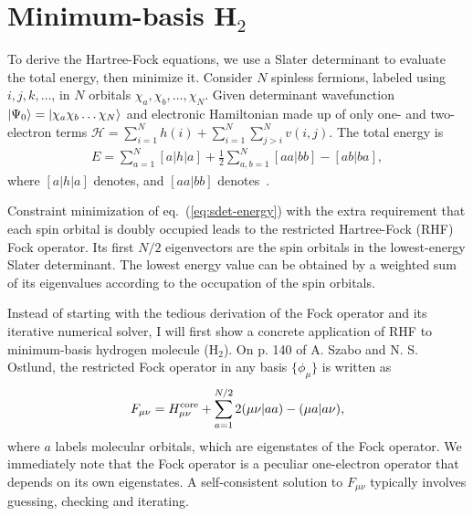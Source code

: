 \chapter{Minimum-basis H$_2$} \label{app:mbh2}
To derive the Hartree-Fock equations, we use a Slater determinant to evaluate the total energy, then minimize it. Consider $N$ spinless fermions, labeled using $i,j,k,\dots$, in $N$ orbitals $\chi_a,\chi_b,\dots,\chi_N$. Given determinant wavefunction $\ket{\Psi_0}=\ket{\chi_a\chi_b\dots\chi_N}$ and electronic Hamiltonian made up of only one- and two-electron terms $\mathcal{H}=\sum\limits_{i=1}^N h(i) + \sum\limits_{i=1}^N\sum\limits_{j>i}^N v(i,j)$. The total energy is
\begin{align} \label{eq:sdet-energy}
E= \sum\limits_{a=1}^N [a|h|a] + \frac{1}{2}\sum\limits_{a,b=1}^N [aa|bb] - [ab|ba],
\end{align}
where $[a|h|a]$ denotes, and $[aa|bb]$ denotes~\cite{Szabo1996}.

Constraint minimization of eq.~(\ref{eq:sdet-energy}) with the extra requirement that each spin orbital is doubly occupied leads to the restricted Hartree-Fock (RHF) Fock operator. Its first $N/2$ eigenvectors are the spin orbitals in the lowest-energy Slater determinant. The lowest energy value can be obtained by a weighted sum of its eigenvalues according to the occupation of the spin orbitals.

Instead of starting with the tedious derivation of the Fock operator and its iterative numerical solver, I will first show a concrete application of RHF to minimum-basis hydrogen molecule (H$_2$). %
On p. 140 of A. Szabo and N. S. Ostlund, the restricted Fock operator in any basis $\{\phi_\mu\}$ is written as
\begin{align}
F_{\mu\nu} = H^{\text{core}}_{\mu\nu} + \sum\limits_{a=1}^{N/2} 2(\mu\nu|aa) - (\mu a|a\nu),
\end{align} %
where $a$ labels molecular orbitals, which are eigenstates of the Fock operator. We immediately note that the Fock operator is a peculiar one-electron operator that depends on its own eigenstates. A self-consistent solution to $F_{\mu\nu}$ typically involves guessing, checking and iterating.

